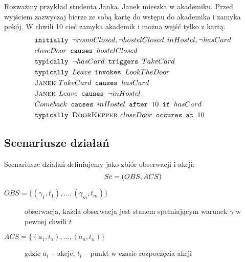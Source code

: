 \begin{example}\label{przyk:syntaktyka_jezyka_akcji}
	Rozważmy przykład studenta Janka. Janek mieszka w akademiku.
	Przed wyjściem zazwyczaj bierze ze sobą kartę do wstępu do akademika i zamyka pokój.
	W chwili 10 cieć zamyka akademik i można wejść tylko z kartą.
	\begin{align*}
	&\texttt{initially } \neg roomClosed, \neg hostelClosed, inHostel, \neg hasCard \\
	&closeDoor \texttt{ causes } hostelClosed \\
	&\texttt{typically } \neg hasCard \texttt{ triggers } TakeCard \\
	&\texttt{typically } Leave \texttt{ invokes } LookTheDoor \\
	&\textsc{Janek } TakeCard \texttt{ causes } hasCard \\
	&\textsc{Janek } Leave \texttt{ causes } \neg inHostel \\
	&Comeback \texttt{ causes } inHostel \texttt{ after } 10 \texttt{ if } hasCard \\
	&\texttt{typically } \textsc{DoorKepper } closeDoor \texttt{ occures at } 10
	\end{align*}
\end{example}


\subsection{Scenariusze działań}
\begin{definition}
Scenariusze działań definiujemy jako zbiór obserwacji i akcji:
\begin{equation}
	Sc = (OBS, ACS)\\
\end{equation}
\begin{description}
	\item[$OBS = \lbrace(\gamma_1, t_1), \dots, (\gamma_m, t_m)\rbrace$]
	obserwacja, każda obserwacja jest stanem spełniającym warunek $\gamma$ w pewnej chwili $t$
	\item[$ACS = \lbrace(a_1, t_1), \dots, (a_n, t_n) \rbrace$]
	gdzie $a_i$ -- akcje, $t_i$ -- punkt w czasie rozpoczęcia akcji
\end{description}
\end{definition}

